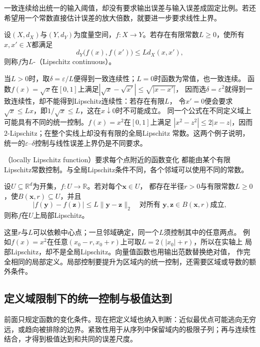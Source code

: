 一致连续给出统一的输入阈值，却没有要求输出误差与输入误差成固定比例。若还希望用一个常数直接估计误差的放大倍数，就要进一步要求线性上界。
\begin{definition}[Lipschitz连续映射]
\label{def:analysis-lipschitz-continuity}
设$(X,d_X)$与$(Y,d_Y)$为度量空间，$f:X\to Y$。若存在有限常数$L\geq0$，使所有$x,x'\in X$都满足
\begin{equation}
  d_Y\bigl(f(x),f(x')\bigr)\leq Ld_X(x,x'),
\label{eq:analysis-lipschitz-condition}
\end{equation}
则称$f$为$L$-（Lipschitz continuous）。
\end{definition}
当$L>0$时，取$\delta=\varepsilon/L$便得到一致连续性；$L=0$时函数为常值，也一致连续。
函数$f(x)=\sqrt{x}$在$[0,1]$上满足$|\sqrt{x}-\sqrt{x'}|\leq\sqrt{|x-x'|}$，
因而选$\delta=\varepsilon^2$就得到一致连续性，却不能得到Lipschitz连续性：若存在有限$L$，
令$x'=0$便会要求$\sqrt{x}\leq Lx$，即$1/\sqrt{x}\leq L$，这在$x\downarrow0$时不可能成立。
同一个公式在不同定义域上可能具有不同的统一控制。$f(x)=x^2$在$[0,1]$上满足
$|x^2-z^2|\leq2|x-z|$，因而$2$-Lipschitz；在整个实线上却没有有限的全局Lipschitz
常数。这两个例子说明，统一的$\varepsilon$--$\delta$控制与线性误差上界仍是不同要求。

（locally Lipschitz function）要求每个点附近的函数变化
都能由某个有限Lipschitz常数控制。与全局Lipschitz条件不同，各个邻域可以使用不同的常数。
\begin{definition}[局部Lipschitz函数]
\label{def:analysis-local-lipschitz}
设$U\subseteq\mathbb{R}^d$为开集，$f:U\to\mathbb{R}$。若对每个$\bm{x}\in U$，
都存在半径$r>0$与有限常数$L\geq0$，使$B(\bm{x},r)\subseteq U$，并且
\[
  |f(\bm{y})-f(\bm{z})|
  \leq L\lVert\bm{y}-\bm{z}\rVert_2
  \quad\text{对所有 }\bm{y},\bm{z}\in B(\bm{x},r)\text{成立},
\]
则称$f$在$U$上局部Lipschitz。
\end{definition}

这里$r$与$L$可以依赖中心点；一旦邻域确定，同一个$L$须控制其中的任意两点。
例如$f(x)=x^2$在任意$(x_0-r,x_0+r)$上可取$L=2(|x_0|+r)$，所以在实轴上
局部Lipschitz，却不是全局Lipschitz。向量值函数也用输出范数替换绝对值，
作完全相同的局部定义。局部控制要提升为区域内的统一控制，还需要区域或导数的额外条件。

\subsection{定义域限制下的统一控制与极值达到}

前面只规定函数的变化条件。现在把定义域也纳入判断：近似最优点可能逃向无穷远，或趋向被排除的边界。紧致性用于从序列中保留域内的极限子列；再与连续性结合，才得到极值达到和共同的误差尺度。

